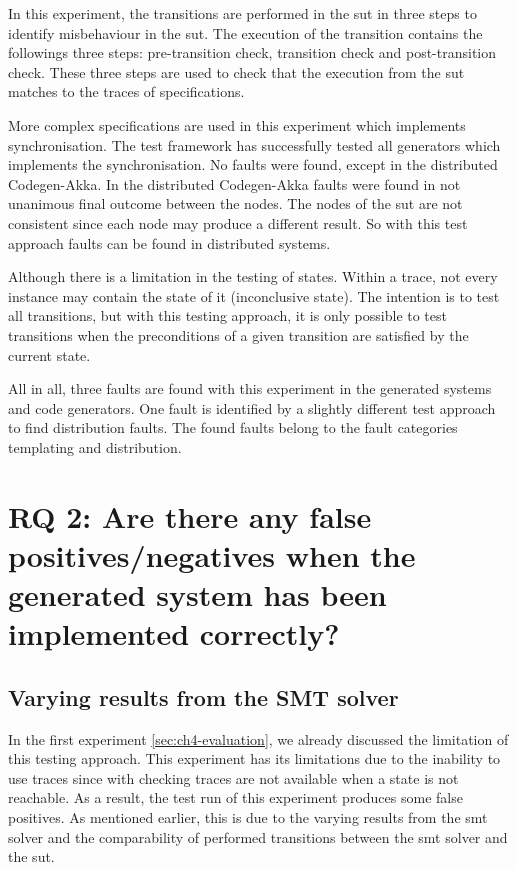 In this experiment, the transitions are performed in the \gls{sut} in three
steps to identify misbehaviour in the \gls{sut}. The execution of the transition
contains the followings three steps: pre-transition check, transition check and
post-transition check. These three steps are used to check that the execution
from the \gls{sut} matches to the traces of specifications.

More complex specifications are used in this experiment which implements
synchronisation. The test framework has successfully tested all generators which
implements the synchronisation. No faults were found, except in the distributed
Codegen-Akka. In the distributed Codegen-Akka faults were found in not unanimous
final outcome between the nodes. The nodes of the \gls{sut} are not consistent
since each node may produce a different result. So with this test approach
faults can be found in distributed systems.

Although there is a limitation in the testing of states. Within a trace, not
every instance may contain the state of it (inconclusive state).
The intention is to test all transitions,
but with this testing approach, it is only possible to test
transitions when the preconditions of a given transition are satisfied by the
current state.

All in all, three faults are found with this experiment in the generated systems
and code generators. One fault is identified by a slightly different test approach
to find distribution faults. The found faults belong to the fault categories
templating and distribution.

\section{RQ 2: Are there any false positives/negatives when the generated system has been implemented correctly?}

\subsection{Varying results from the SMT solver}
In the first experiment \autoref{sec:ch4-evaluation}, we already discussed the limitation of this
testing approach. This experiment has its limitations due to the inability to
use traces since with checking traces are not available when a state is not
reachable. As a result, the test run of this experiment produces some false
positives. As mentioned earlier, this is due to the varying results from the
\gls{smt} solver and the comparability of performed transitions between the
\gls{smt} solver and the \gls{sut}.

